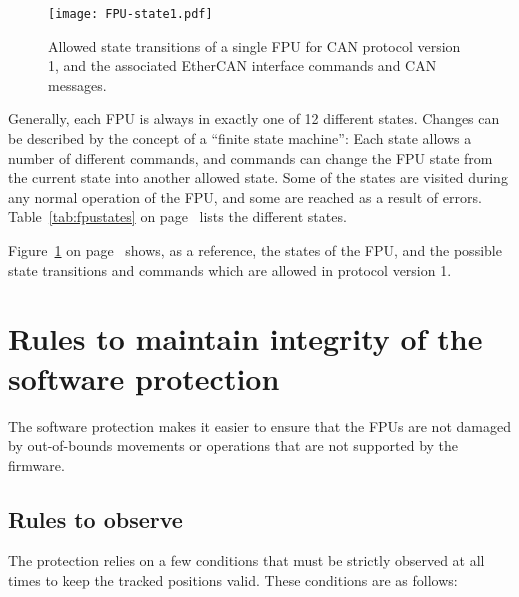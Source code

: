 \documentclass[11pt,a4paper]{report}
\begin{document}
\begin{figure}
  \texttt{[image: FPU-state1.pdf]}
  \caption{Allowed state transitions of a single FPU for CAN protocol
    version 1, and the associated EtherCAN interface commands and CAN messages.}
  \label{fig:states}
\end{figure}


Generally, each FPU is always in exactly one of 12 different states.
Changes can be described by the concept of a ``finite state machine'':
Each state allows a number of different commands, and commands can
change the FPU state from the current state into another allowed
state.  Some of the states are visited during any normal operation of
the FPU, and some are reached as a result of errors.
Table~\ref{tab:fpustates} on page~\pageref{tab:fpustates} lists the
different states.


Figure~\ref{fig:states} on page~\pageref{fig:states} shows, as a
reference, the states of the FPU, and the possible state transitions
and commands which are allowed in protocol version 1.


\section{Rules to maintain integrity of the software protection}
\label{sec:protectionrules}

The software protection makes it easier to ensure that the FPUs are
not damaged by out-of-bounds movements or operations that are not
supported by the firmware.

\subsection{Rules to observe}
The protection relies on a few conditions that must be strictly
observed at all times to keep the tracked positions valid. These
conditions are as follows:
\end{document}

